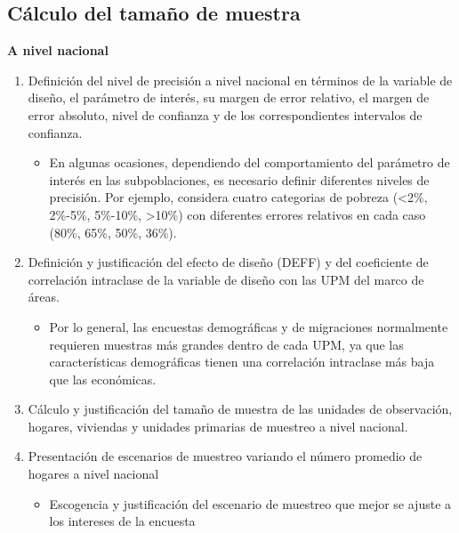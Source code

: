 \documentclass[12pt,spanish,]{book}
\providecommand{\tightlist}{%
  \setlength{\itemsep}{0pt}\setlength{\parskip}{0pt}}
\begin{document}
\hypertarget{calculo-del-tamano-de-muestra}{%
\subsection*{Cálculo del tamaño de muestra}\label{calculo-del-tamano-de-muestra}}

\textbf{A nivel nacional}

\begin{enumerate}
\def\labelenumi{\arabic{enumi}.}
\tightlist
\item
  Definición del nivel de precisión a nivel nacional en términos de la variable de diseño, el parámetro de interés, su margen de error relativo, el margen de error absoluto, nivel de confianza y de los correspondientes intervalos de confianza.

  \begin{itemize}
  \tightlist
  \item
    En algunas ocasiones, dependiendo del comportamiento del parámetro de interés en las subpoblaciones, es necesario definir diferentes niveles de precisión. Por ejemplo, \textcite{Caceres_2015} considera cuatro categorias de pobreza (\textless{}2\%, 2\%-5\%, 5\%-10\%, \textgreater{}10\%) con diferentes errores relativos en cada caso (80\%, 65\%, 50\%, 36\%).
  \end{itemize}
\item
  Definición y justificación del efecto de diseño (DEFF) y del coeficiente de correlación intraclase de la variable de diseño con las UPM del marco de áreas.

  \begin{itemize}
  \tightlist
  \item
    Por lo general, las encuestas demográficas y de migraciones normalmente
    requieren muestras más grandes dentro de cada UPM, ya que las características demográficas tienen una correlación intraclase más baja que las económicas.
  \end{itemize}
\item
  Cálculo y justificación del tamaño de muestra de las unidades de observación, hogares, viviendas y unidades primarias de muestreo a nivel nacional.
\item
  Presentación de escenarios de muestreo variando el número promedio de hogares a nivel nacional

  \begin{itemize}
  \tightlist
  \item
    Escogencia y justificación del escenario de muestreo que mejor se ajuste a los intereses de la encuesta
  \end{itemize}
\end{enumerate}
\end{document}

